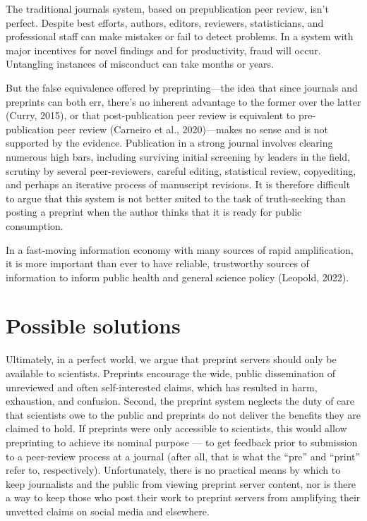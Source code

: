\documentclass[authordate, perspective]{jote-new-article}
\begin{document}
	The traditional journals system, based on prepublication peer review, isn't perfect. Despite best efforts, authors, editors, reviewers, statisticians, and professional staff can make mistakes or fail to detect problems. In a system with major incentives for novel findings and for productivity, fraud will occur. Untangling instances of misconduct can take months or years.







	But the false equivalence offered by preprinting—the idea that since journals and preprints can both err, there's no inherent advantage to the former over the latter (Curry, 2015), or that post-publication peer review is equivalent to pre-publication peer review (Carneiro et al., 2020)—makes no sense and is not supported by the evidence. Publication in a strong journal involves clearing numerous high bars, including surviving initial screening by leaders in the field, scrutiny by several peer-reviewers, careful editing, statistical review, copyediting, and perhaps an iterative process of manuscript revisions. It is therefore difficult to argue that this system is not better suited to the task of truth-seeking than posting a preprint when the author thinks that it is ready for public consumption.







	In a fast-moving information economy with many sources of rapid amplification, it is more important than ever to have reliable, trustworthy sources of information to inform public health and general science policy (Leopold, 2022).







	\section{Possible solutions}







	Ultimately, in a perfect world, we argue that preprint servers should only be available to scientists. Preprints encourage the wide, public dissemination of unreviewed and often self-interested claims, which has resulted in harm, exhaustion, and confusion. Second, the preprint system neglects the duty of care that scientists owe to the public and preprints do not deliver the benefits they are claimed to hold. If preprints were only accessible to scientists, this would allow preprinting to achieve its nominal purpose — to get feedback prior to submission to a peer-review process at a journal (after all, that is what the “pre” and “print” refer to, respectively). Unfortunately, there is no practical means by which to keep journalists and the public from viewing preprint server content, nor is there a way to keep those who post their work to preprint servers from amplifying their unvetted claims on social media and elsewhere.
\end{document}
